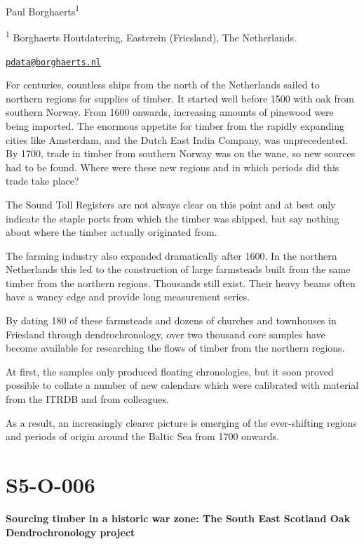 \documentclass[
]{book}
\begin{document}
Paul Borghaerts\textsuperscript{1}

\textsuperscript{1} Borghaerts Houtdatering, Easterein (Friesland), The Netherlands.

\href{mailto:pdata@borghaerts.nl}{\nolinkurl{pdata@borghaerts.nl}}

For centuries, countless ships from the north of the Netherlands sailed to northern regions for supplies of timber. It started well before 1500 with oak from southern Norway. From 1600 onwards, increasing amounts of pinewood were being imported. The enormous appetite for timber from the rapidly expanding cities like Amsterdam, and the Dutch East India Company, was unprecedented. By 1700, trade in timber from southern Norway was on the wane, so new sources had to be found. Where were these new regions and in which periods did this trade take place?

The Sound Toll Registers are not always clear on this point and at best only indicate the staple ports from which the timber was shipped, but say nothing about where the timber actually originated from.

The farming industry also expanded dramatically after 1600. In the northern Netherlands this led to the construction of large farmsteads built from the same timber from the northern regions. Thousands still exist. Their heavy beams often have a waney edge and provide long measurement series.

By dating 180 of these farmsteads and dozens of churches and townhouses in Friesland through dendrochronology, over two thousand core samples have become available for researching the flows of timber from the northern regions.

At first, the samples only produced floating chronologies, but it soon proved possible to collate a number of new calendars which were calibrated with material from the ITRDB and from colleagues.

As a result, an increasingly clearer picture is emerging of the ever-shifting regions and periods of origin around the Baltic Sea from 1700 onwards.

\hypertarget{s5-o-006}{%
\section*{S5-O-006}\label{s5-o-006}}

\textbf{Sourcing timber in a historic war zone: The South East Scotland Oak Dendrochronology project}
\end{document}
